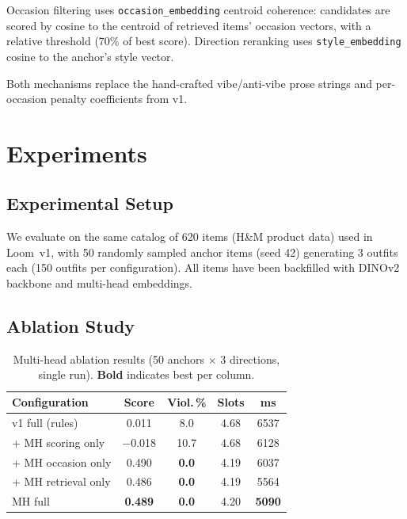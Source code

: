 \documentclass[10pt,twocolumn]{article}
\begin{document}
Occasion filtering uses \texttt{occasion\_embedding} centroid coherence:
candidates are scored by cosine to the centroid of retrieved items'
occasion vectors, with a relative threshold (70\% of best score).
Direction reranking uses \texttt{style\_embedding} cosine to the anchor's
style vector.

Both mechanisms replace the hand-crafted vibe/anti-vibe prose strings and
per-occasion penalty coefficients from v1.

\section{Experiments}
\label{sec:experiments}

\subsection{Experimental Setup}

We evaluate on the same catalog of 620 items (H\&M product data) used in
Loom~v1, with 50 randomly sampled anchor items (seed 42) generating
3 outfits each (150 outfits per configuration).  All items have been
backfilled with DINOv2 backbone and multi-head embeddings.

\subsection{Ablation Study}

\begin{table}[t]
\centering
\small
\caption{Multi-head ablation results (50 anchors $\times$ 3 directions,
single run).  \textbf{Bold} indicates best per column.}
\label{tab:mh_ablation}
\begin{tabular}{@{}lcccc@{}}
\toprule
Configuration & Score & Viol.\,\% & Slots & ms \\
\midrule
v1 full (rules)          &  0.011 & 8.0 & 4.68 & 6537 \\
\midrule
+ MH scoring only        & $-$0.018 & 10.7 & 4.68 & 6128 \\
+ MH occasion only       &  0.490 & \textbf{0.0} & 4.19 & 6037 \\
+ MH retrieval only      &  0.486 & \textbf{0.0} & 4.19 & 5564 \\
\midrule
MH full                  & \textbf{0.489} & \textbf{0.0} & 4.20 & \textbf{5090} \\
\bottomrule
\end{tabular}
\end{table}
\end{document}
